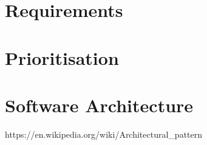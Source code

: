 \section{Requirements}
\section{Prioritisation}
\section{Software Architecture}


https://en.wikipedia.org/wiki/Architectural\_pattern